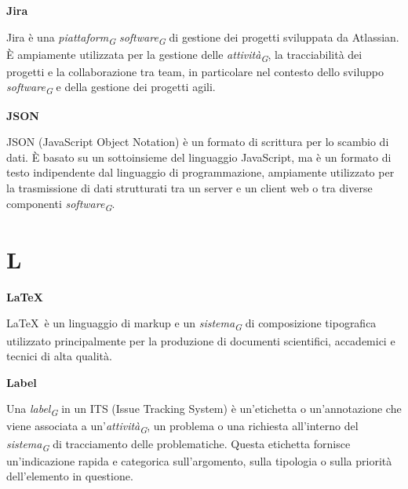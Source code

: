 \documentclass{article}
\begin{document}
\vspace{0.4cm}

\textbf{Jira}

\vspace{0.1cm}

Jira è una \textit{piattaform}\textsubscript{\textit{G}} \textit{software}\textsubscript{\textit{G}} di gestione dei progetti sviluppata da Atlassian. È ampiamente utilizzata per la gestione delle \textit{attività}\textsubscript{\textit{G}}, la tracciabilità dei progetti e la collaborazione tra team, in particolare nel contesto dello sviluppo \textit{software}\textsubscript{\textit{G}} e della gestione dei progetti agili.

\vspace{0.4cm}

\textbf{JSON}

\vspace{0.1cm}

JSON (JavaScript Object Notation) è un formato di scrittura per lo scambio di dati. È basato su un sottoinsieme del linguaggio JavaScript, ma è un formato di testo indipendente dal linguaggio di programmazione, ampiamente utilizzato per la trasmissione di dati strutturati tra un server e un client web o tra diverse componenti \textit{software}\textsubscript{\textit{G}}.

\pagebreak
\section*{L}
{}

\vspace{0.4cm}

\textbf{\LaTeX}

\vspace{0.1cm}

\LaTeX\ è un linguaggio di markup e un \textit{sistema}\textsubscript{\textit{G}} di composizione tipografica utilizzato principalmente per la produzione di documenti scientifici, accademici e tecnici di alta qualità.

\vspace{0.4cm}

\textbf{Label}

\vspace{0.1cm}

Una \textit{label}\textsubscript{\textit{G}} in un ITS (Issue Tracking System) è un'etichetta o un'annotazione che viene associata a un'\textit{attività}\textsubscript{\textit{G}}, un problema o una richiesta all'interno del \textit{sistema}\textsubscript{\textit{G}} di tracciamento delle problematiche. Questa etichetta fornisce un'indicazione rapida e categorica sull'argomento, sulla tipologia o sulla priorità dell'elemento in questione.
\end{document}
